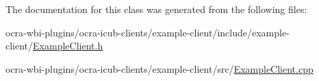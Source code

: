 \-The documentation for this class was generated from the following files\-:\begin{DoxyCompactItemize}
\item 
ocra-\/wbi-\/plugins/ocra-\/icub-\/clients/example-\/client/include/example-\/client/\hyperlink{ExampleClient_8h}{\-Example\-Client.\-h}\item 
ocra-\/wbi-\/plugins/ocra-\/icub-\/clients/example-\/client/src/\hyperlink{ExampleClient_8cpp}{\-Example\-Client.\-cpp}\end{DoxyCompactItemize}

